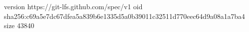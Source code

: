 version https://git-lfs.github.com/spec/v1
oid sha256:c69a5e7dc67dfea5a839b6e1335d5a0b39011c32511d770eec64d9a08a1a7ba4
size 43840

